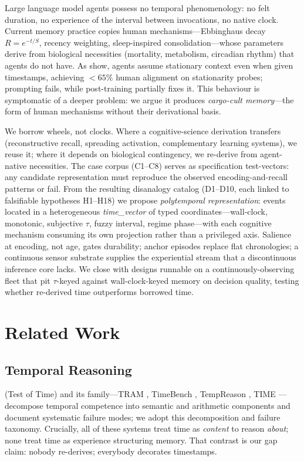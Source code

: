 \documentclass[letterpaper]{article}
\begin{document}
Large language model agents possess no temporal phenomenology: no felt duration, no experience of the interval between invocations, no native clock. Current memory practice copies human mechanisms---Ebbinghaus decay $R=e^{-t/S}$, recency weighting, sleep-inspired consolidation---whose parameters derive from biological necessities (mortality, metabolism, circadian rhythm) that agents do not have. As \citet{cheng2026blind} show, agents assume stationary context even when given timestamps, achieving $<65\%$ human alignment on stationarity probes; prompting fails, while post-training partially fixes it. This behaviour is symptomatic of a deeper problem: we argue it produces \emph{cargo-cult memory}---the form of human mechanisms without their derivational basis.

We borrow wheels, not clocks. Where a cognitive-science derivation transfers (reconstructive recall, spreading activation, complementary learning systems), we reuse it; where it depends on biological contingency, we re-derive from agent-native necessities. The case corpus (C1--C8) serves as specification test-vectors: any candidate representation must reproduce the observed encoding-and-recall patterns or fail. From the resulting disanalogy catalog (D1--D10, each linked to falsifiable hypotheses H1--H18) we propose \emph{polytemporal representation}: events located in a heterogeneous \emph{time\_vector} of typed coordinates---wall-clock, monotonic, subjective $\tau$, fuzzy interval, regime phase---with each cognitive mechanism consuming its own projection rather than a privileged axis. Salience at encoding, not age, gates durability; anchor episodes replace flat chronologies; a continuous sensor substrate supplies the experiential stream that a discontinuous inference core lacks. We close with designs runnable on a continuously-observing fleet that pit $\tau$-keyed against wall-clock-keyed memory on decision quality, testing whether re-derived time outperforms borrowed time.

\section{Related Work}
\subsection{Temporal Reasoning}
\citet{fatemi2025tot} (Test of Time) and its family---TRAM \citep{tram2024}, TimeBench \citep{chu2024timebench}, TempReason \citep{tan2023tempreason}, TIME \citep{yuan2025time}---decompose temporal competence into semantic and arithmetic components and document systematic failure modes; we adopt this decomposition and failure taxonomy. Crucially, all of these systems treat time as \emph{content} to reason \emph{about}; none treat time as experience structuring memory. That contrast is our gap claim: nobody re-derives; everybody decorates timestamps.
\end{document}
